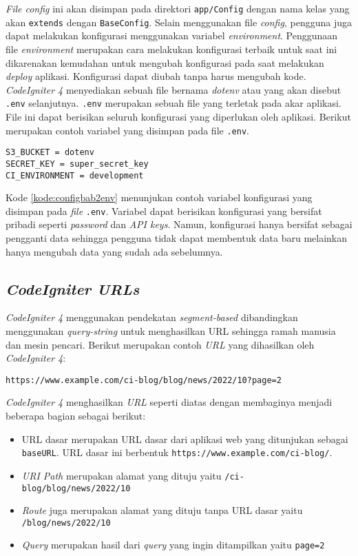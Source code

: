 \textit{File config} ini akan disimpan pada direktori \texttt{app/Config} dengan nama kelas yang akan \texttt{extends} dengan \texttt{BaseConfig}. Selain menggunakan file \textit{config}, pengguna juga dapat melakukan konfigurasi menggunakan variabel \textit{environment}. Penggunaan file \textit{environment} merupakan cara melakukan konfigurasi terbaik untuk saat ini dikarenakan kemudahan untuk mengubah konfigurasi pada saat melakukan \textit{deploy} aplikasi. Konfigurasi dapat diubah tanpa harus mengubah kode. \textit{CodeIgniter 4} menyediakan sebuah file bernama \textit{dotenv} atau yang akan disebut \texttt{.env} selanjutnya. \texttt{.env} merupakan sebuah file yang terletak pada akar aplikasi. File ini dapat berisikan seluruh konfigurasi yang diperlukan oleh aplikasi. Berikut merupakan contoh variabel yang disimpan pada file \texttt{.env}.
\begin{lstlisting}[caption=Contoh variabel yang disimpan pada file \texttt{.env}. ,label=kode:configbab2env]
S3_BUCKET = dotenv
SECRET_KEY = super_secret_key
CI_ENVIRONMENT = development
\end{lstlisting}
Kode \ref{kode:configbab2env} menunjukan contoh variabel konfigurasi yang disimpan pada \textit{file} \texttt{.env}. Variabel dapat berisikan konfigurasi yang bersifat pribadi seperti \textit{password} dan \textit{API keys}. Namun, konfigurasi hanya bersifat sebagai pengganti data sehingga pengguna tidak dapat membentuk data baru melainkan hanya mengubah data yang sudah ada sebelumnya.

\subsection{\textit{CodeIgniter URLs}}
\textit{CodeIgniter 4} menggunakan pendekatan \textit{segment-based} dibandingkan menggunakan \textit{query-string} untuk menghasilkan URL sehingga ramah manusia dan mesin pencari. Berikut merupakan contoh \textit{URL} yang dihasilkan oleh \textit{CodeIgniter 4}:

\begin{center}
\texttt{https://www.example.com/ci-blog/blog/news/2022/10?page=2}
\end{center}

\textit{CodeIgniter 4} menghasilkan \textit{URL} seperti diatas dengan membaginya menjadi beberapa bagian sebagai berikut:

\begin{itemize}
\item URL dasar merupakan URL dasar dari aplikasi web yang ditunjukan sebagai \texttt{baseURL}. URL dasar ini berbentuk \texttt{https://www.example.com/ci-blog/}.
\item \textit{URI Path} merupakan alamat yang dituju yaitu \texttt{/ci-blog/blog/news/2022/10} 
\item \textit{Route} juga merupakan alamat yang dituju tanpa URL dasar yaitu \texttt{/blog/news/2022/10} 
\item \textit{Query} merupakan hasil dari \textit{query} yang ingin ditampilkan yaitu \texttt{page=2}
\end{itemize}

